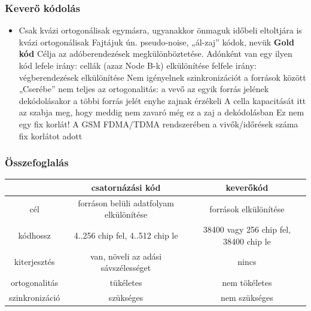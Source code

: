 \documentclass[10pt,a4paper]{article}
\begin{document}
\subsubsection{Keverő kódolás}
\begin{itemize}
	\item Csak kvázi ortogonálisak egymásra, ugyanakkor önmaguk időbeli
	eltoltjára is kvázi ortogonálisak
	\subitem Fajtájuk ún. pseudo-noise, „ál-zaj” kódok, nevük \textbf{Gold kód}
	\subitem Célja az adóberendezések megkülönböztetése. Adónként van egy
	ilyen kód
	\subitem lefele irány: cellák (azaz Node B-k) elkülönítése
	\subitem felfele irány: végberendezések elkülönítése
	\subitem Nem igényelnek szinkronizációt a források között
	\subitem „Cserébe” nem teljes az ortogonalitás: a vevő az egyik forrás jelének
	dekódolásakor a többi forrás jelét enyhe zajnak érzékeli
	\subitem A cella kapacitását itt az szabja meg, hogy meddig nem zavaró még
	ez a zaj a dekódolásban
	\subitem Ez nem egy fix korlát!
	\subitem A GSM FDMA/TDMA rendszerében a vivők/időrések száma fix korlátot
	adott
\end{itemize}
\subsubsection{Összefoglalás}
\begin{tabular}{|c|c|c|}
	\hline 
	& csatornázási kód & keverőkód \\ 
	\hline 
	cél & forráson belüli adatfolyam elkülönítése & források elkülönítése \\ 
	\hline 
	kódhossz & 4..256 chip fel, 4..512 chip le & 38400 vagy 256 chip fel, 38400 chip le \\ 
	\hline 
	kiterjesztés & van, növeli az adási sávszélességet & nincs \\ 
	\hline 
	ortogonalitás & tükéletes & nem tökéletes \\ 
	\hline 
	szinkronizáció & szükséges & nem szükséges \\ 
	\hline 
\end{tabular} 
\end{document}
